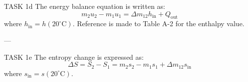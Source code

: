 TASK 1d  
The energy balance equation is written as:  
\[
m_2 u_2 - m_1 u_1 = \Delta m_{12} h_{\text{in}} + Q_{\text{out}}
\]  
where \( h_{\text{in}} = h(20^\circ\text{C}) \). Reference is made to Table A-2 for the enthalpy value.

---

TASK 1e  
The entropy change is expressed as:  
\[
\Delta S = S_2 - S_1 = m_2 s_2 - m_1 s_1 + \Delta m_{12} s_{\text{in}}
\]  
where \( s_{\text{in}} = s(20^\circ\text{C}) \).